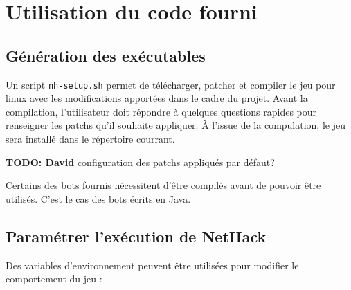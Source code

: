 \documentclass[10pt,a4paper]{report}
\begin{document}
\tableofcontents

\chapter{Utilisation du code fourni}
\section{Génération des exécutables}

Un script \verb!nh-setup.sh! permet de télécharger, patcher et compiler le jeu
pour linux avec les modifications apportées dans le cadre du projet.
Avant la compilation, l'utilisateur doit répondre à quelques questions rapides
pour renseigner les patchs qu'il souhaite appliquer. À l'issue de la
compulation, le jeu sera installé dans le répertoire courrant.

\textbf{TODO: David} configuration des patchs appliqués par défaut?

Certains des bots fournis nécessitent d'être compilés avant de pouvoir être
utilisés. C'est le cas des bots écrits en Java.



\section{Paramétrer l'exécution de NetHack}

Des variables d'environnement peuvent être utilisées pour modifier le
comportement du jeu :
\end{document}
